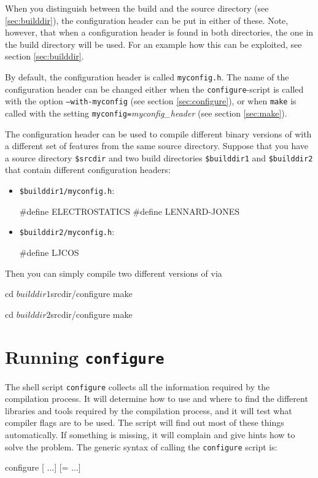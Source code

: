 When you distinguish between the build and the source directory (see
\vref{sec:builddir}), the configuration header can be put in either of
these. Note, however, that when a configuration header is found in
both directories, the one in the build directory will be used.  For an
example how this can be exploited, see section \ref{sec:builddir}.

By default, the configuration header is called \texttt{myconfig.h}.
The name of the configuration header can be changed either when the
\texttt{configure}-script is called with the option
\mbox{\texttt{--with-myconfig}} (see section \vref{sec:configure}), or
when \texttt{make} is called with the setting
\mbox{\texttt{myconfig=}\textit{myconfig\_header}} (see section
\vref{sec:make}).

The configuration header can be used to compile different binary
versions of \es with a different set of features from the same source
directory.  Suppose that you have a source directory \texttt{\$srcdir}
and two build directories \texttt{\$builddir1} and
\texttt{\$builddir2} that contain different configuration headers:

\begin{itemize}
\item \texttt{\$builddir1/myconfig.h}:
\begin{code}
#define ELECTROSTATICS
#define LENNARD-JONES
\end{code}

\item \texttt{\$builddir2/myconfig.h}:
\begin{code}
#define LJCOS
\end{code}
\end{itemize}

\noindent Then you can simply compile two different versions of \es via
\begin{code}
cd $builddir1
$srcdir/configure
make

cd $builddir2
$srcdir/configure
make
\end{code}


\section{Running \texttt{configure}}
\label{sec:configure}


 The shell script \texttt{configure} collects all the
information required by the compilation process. It will determine how
to use and where to find the different libraries and tools required by
the compilation process, and it will test what compiler flags are to
be used.  The script will find out most of these things automatically.
If something is missing, it will complain and give hints how to solve
the problem.  The generic syntax of calling the \texttt{configure}
script is:
\begin{code}
configure [ ...] [= ...]
\end{code}

